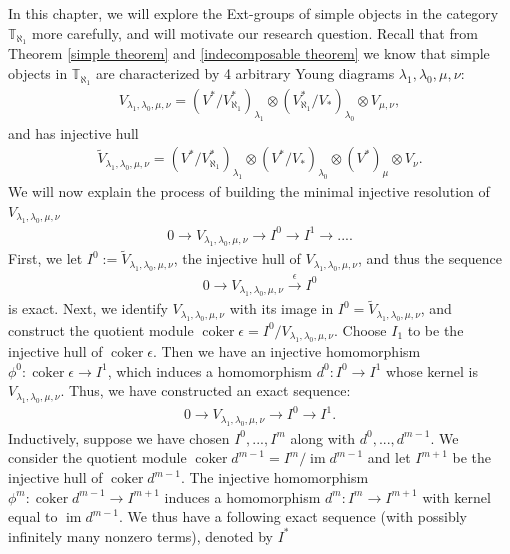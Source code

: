 \documentclass[openany, a4paper]{amsbook}
\theoremstyle{definition}
\numberwithin{equation}{chapter}
\newcommand{\T}[1]{{\mathbb{T}}_{\aleph_{#1}}}
\DeclareMathOperator{\im}{\mathrm{im}}
\DeclareMathOperator{\coker}{\mathrm{coker}}
\begin{document}
In this chapter, we will explore the Ext-groups of simple objects in the category $\T{1}$ more carefully, and will motivate our research question. Recall that from Theorem \ref{simple theorem} and \ref{indecomposable theorem} we know that simple objects in $\T{1}$ are characterized by 4 arbitrary Young diagrams $\lambda_1, \lambda_0, \mu, \nu$: 
\begin{align*}
    V_{\lambda_1, \lambda_0, \mu, \nu} = (V^\ast/V^\ast_{\aleph_1})_{\lambda_1} \otimes (V^\ast_{\aleph_1}/V_\ast)_{\lambda_0} \otimes V_{\mu, \nu},
\end{align*}
and has injective hull 
\begin{align*}
    \tilde{V}_{\lambda_1, \lambda_0, \mu, \nu} = (V^\ast/V^\ast_{\aleph_1})_{\lambda_1} \otimes (V^\ast/V_\ast)_{\lambda_0} \otimes (V^\ast)_\mu \otimes V_\nu.
\end{align*}
We will now explain the process of building the minimal injective resolution of $V_{\lambda_1, \lambda_0, \mu, \nu}$
\begin{align*}
    0 \to V_{\lambda_1, \lambda_0, \mu, \nu} \to I^0 \to I^1 \to ... .
\end{align*} 
First, we let $I^0 := \tilde{V}_{\lambda_1, \lambda_0, \mu, \nu}$, the injective hull of $V_{\lambda_1, \lambda_0, \mu, \nu}$, and thus the sequence
\begin{align*}
    0 \rightarrow V_{\lambda_1, \lambda_0, \mu, \nu} \xrightarrow{\epsilon} I^0
\end{align*} 
is exact. Next, we identify $V_{\lambda_1, \lambda_0, \mu, \nu}$ with its image in $I^0 = \tilde{V}_{\lambda_1, \lambda_0, \mu, \nu}$, and construct the quotient module $\coker \epsilon= I^0/V_{\lambda_1, \lambda_0, \mu, \nu}$. Choose $I_1$ to be the injective hull of $\coker \epsilon$. Then we have an injective homomorphism $\phi^0:\coker \epsilon \to I^1$, which induces a homomorphism $d^0: I^0 \to I^1$ whose kernel is $V_{\lambda_1, \lambda_0, \mu, \nu}$. Thus, we have constructed an exact sequence:
\begin{align*}
    0 \rightarrow V_{\lambda_1, \lambda_0, \mu, \nu} \rightarrow I^0 \rightarrow I^1.
\end{align*} 
Inductively, suppose we have chosen $I^0, ..., I^m$ along with $d^{0}, ..., d^{m-1}$. We consider the quotient module $\coker d^{m-1} = I^m/\im d^{m-1}$ and let $I^{m+1}$ be the injective hull of $\coker d^{m-1}$. The injective homomorphism $\phi^{m}: \coker d^{m-1} \to I^{m+1}$ induces a homomorphism $d^m: I^m \to I^{m+1}$ with kernel equal to $\im d^{m-1}$. We thus have a following exact sequence (with possibly infinitely many nonzero terms), denoted by $I^\ast$
\end{document}

